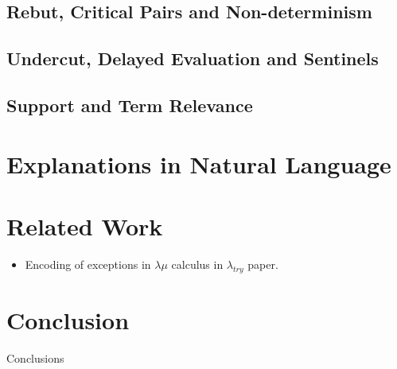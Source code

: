 \documentclass{ecai}
\begin{document}
\subsection{Rebut, Critical Pairs and Non-determinism}
\subsection{Undercut, Delayed Evaluation and Sentinels}
\subsection{Support and Term Relevance}
\section{Explanations in Natural Language}
\section{Related Work}

\begin{scratch}
  \begin{itemize}
  \item Encoding of exceptions in $\lambda\mu$ calculus in $\lambda_{try}$ paper.
  \end{itemize}
\end{scratch}

\section{Conclusion}
Conclusions
\end{document}
